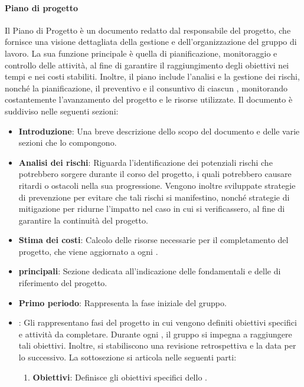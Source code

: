 \paragraph{Piano di progetto}
Il Piano di Progetto è un documento redatto dal responsabile del progetto, che fornisce una visione dettagliata della gestione e dell’organizzazione del gruppo di lavoro. La sua funzione principale è quella di pianificazione, monitoraggio e controllo delle attività, al fine di garantire il raggiungimento degli obiettivi nei tempi e nei costi stabiliti. Inoltre, il piano include l'analisi e la gestione dei rischi, nonché la pianificazione, il preventivo e il consuntivo di ciascun , monitorando costantemente l'avanzamento del progetto e le risorse utilizzate.
Il documento è suddiviso nelle seguenti sezioni:
\begin{itemize}
    \item \textbf{Introduzione}: Una breve descrizione dello scopo del documento e delle varie sezioni che lo compongono.
    \item \textbf{Analisi dei rischi}: Riguarda l'identificazione dei potenziali rischi che potrebbero sorgere durante il corso del progetto, i quali potrebbero causare ritardi o ostacoli nella sua progressione. Vengono inoltre sviluppate strategie di prevenzione per evitare che tali rischi si manifestino, nonché strategie di mitigazione per ridurne l'impatto nel caso in cui si verificassero, al fine di garantire la continuità del progetto.
    \item \textbf{Stima dei costi}: Calcolo delle risorse necessarie per il completamento del progetto, che viene aggiornato a ogni .
    \item \textbf{ principali}: Sezione dedicata all'indicazione delle  fondamentali e delle  di riferimento del progetto.
    \item \textbf{Primo periodo}: Rappresenta la fase iniziale del gruppo.
    \item \textbf{}: Gli  rappresentano fasi del progetto in cui vengono definiti obiettivi specifici e attività da completare. Durante ogni , il gruppo si impegna a raggiungere tali obiettivi. Inoltre, si stabiliscono una revisione retrospettiva e la data per lo  successivo.
    La sottosezione si articola nelle seguenti parti:
    \begin{enumerate}
        \item \textbf{Obiettivi}: Definisce gli obiettivi specifici dello .

\end{enumerate}
\end{itemize}
